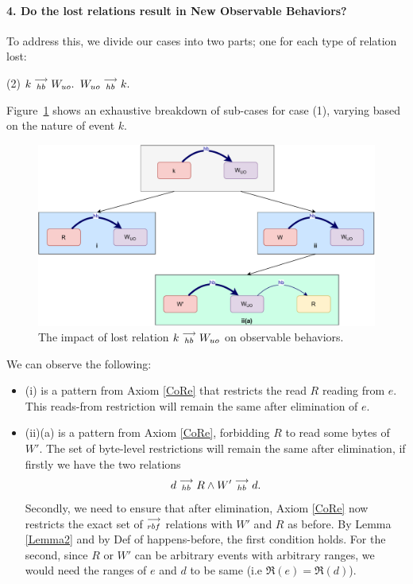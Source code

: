 \paragraph{4. Do the lost relations result in New Observable Behaviors?}

    To address this, we divide our cases into two parts; one for each type of relation lost:
    \begin{tasks}[style=enumerate](2)
        \task $k\stackrel{\longrightarrow}{_{hb}}W_{uo}.$
        \task $W_{uo}\stackrel{\longrightarrow}{_{hb}}k.$
    \end{tasks}

    Figure~\ref{elim_write:case1} shows an exhaustive breakdown of sub-cases for case (1), varying based
    on the nature of event $k$.
    \begin{figure}[H]
        \centering
        \includegraphics[scale=0.5]{5.Elimination/1.ValidEliminationCandidate/WriteElimProof/ProofParts/Part4Case1.pdf}
        \caption{The impact of lost relation $k\stackrel{\longrightarrow}{_{hb}}W_{uo}$ on observable behaviors.}
        \label{elim_write:case1}
    \end{figure}

    We can observe the following:
    \begin{itemize}
        \item (i) is a pattern from Axiom \ref{CoRe} that restricts the read $R$ reading from $e$. This reads-from restriction will remain the same after elimination of $e$. 
        \item (ii)(a) is a pattern from Axiom \ref{CoRe}, forbidding $R$ to read some bytes of $W'$. 
        The set of byte-level restrictions will remain the same after elimination, if firstly we have the two relations
        \begin{align*}
            d\stackrel{\longrightarrow}{_{hb}}R \wedge W'\stackrel{\longrightarrow}{_{hb}}d.
        \end{align*}
        Secondly, we need to ensure that after elimination, Axiom \ref{CoRe} now restricts the exact set of $\stackrel{\longrightarrow}{_{rbf}}$ relations with $W'$ and $R$ as before. 
        By Lemma \ref{Lemma2} and by Def of happens-before, the first condition holds. 
        For the second, since $R$ or $W'$ can be arbitrary events with arbitrary ranges, we would need the ranges of $e$ and $d$ to be same (i.e $\Re(e) = \Re(d)$).
    \end{itemize}

